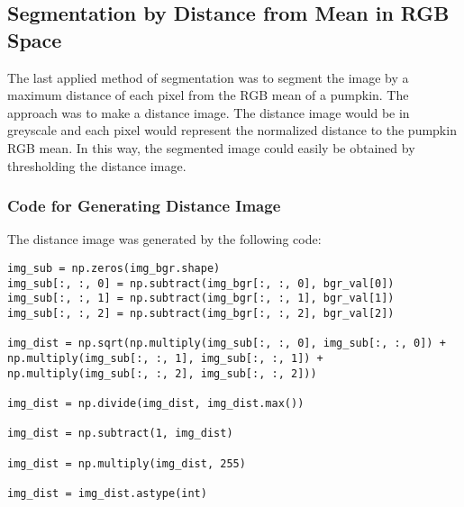 \documentclass[../Head/Main.tex]{subfiles}
\begin{document}
\subsection{Segmentation by Distance from Mean in RGB Space}
The last applied method of segmentation was to segment the image by a maximum distance of each pixel from the RGB mean of a pumpkin. The approach was to make a distance image. The distance image would be in greyscale and each pixel would represent the normalized distance to the pumpkin RGB mean. In this way, the segmented image could easily be obtained by thresholding the distance image.

\subsubsection{Code for Generating Distance Image}
The distance image was generated by the following code:
\begin{verbatim}
img_sub = np.zeros(img_bgr.shape)
img_sub[:, :, 0] = np.subtract(img_bgr[:, :, 0], bgr_val[0])
img_sub[:, :, 1] = np.subtract(img_bgr[:, :, 1], bgr_val[1])
img_sub[:, :, 2] = np.subtract(img_bgr[:, :, 2], bgr_val[2])

img_dist = np.sqrt(np.multiply(img_sub[:, :, 0], img_sub[:, :, 0]) +
np.multiply(img_sub[:, :, 1], img_sub[:, :, 1]) + 
np.multiply(img_sub[:, :, 2], img_sub[:, :, 2]))

img_dist = np.divide(img_dist, img_dist.max())

img_dist = np.subtract(1, img_dist)

img_dist = np.multiply(img_dist, 255)

img_dist = img_dist.astype(int) 
\end{verbatim}
\end{document}

